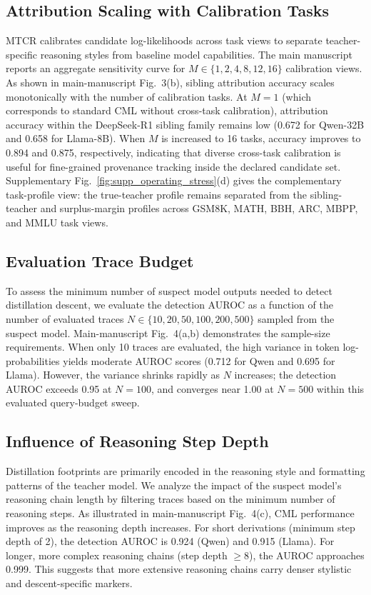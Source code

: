 \subsection{Attribution Scaling with Calibration Tasks}
MTCR calibrates candidate log-likelihoods across task views to separate teacher-specific reasoning styles from baseline model capabilities. The main manuscript reports an aggregate sensitivity curve for $M \in \{1, 2, 4, 8, 12, 16\}$ calibration views.
As shown in main-manuscript Fig.~3(b), sibling attribution accuracy scales
monotonically with the number of calibration tasks. At $M=1$ (which corresponds to
standard CML without cross-task calibration), attribution accuracy within the
DeepSeek-R1 sibling family remains low (0.672 for Qwen-32B and 0.658 for Llama-8B).
When $M$ is increased to 16 tasks, accuracy improves to 0.894 and 0.875,
respectively, indicating that diverse cross-task calibration is useful for
fine-grained provenance tracking inside the declared candidate set. Supplementary
Fig.~\ref{fig:supp_operating_stress}(d) gives the complementary task-profile view:
the true-teacher profile remains separated from the sibling-teacher and surplus-margin
profiles across GSM8K, MATH, BBH, ARC, MBPP, and MMLU task views.

\subsection{Evaluation Trace Budget}
To assess the minimum number of suspect model outputs needed to detect distillation descent, we evaluate the detection AUROC as a function of the number of evaluated traces $N \in \{10, 20, 50, 100, 200, 500\}$ sampled from the suspect model.
Main-manuscript Fig.~4(a,b) demonstrates the sample-size requirements. When only 10
traces are evaluated, the high variance in token log-probabilities yields moderate
AUROC scores (0.712 for Qwen and 0.695 for Llama). However, the variance shrinks
rapidly as $N$ increases; the detection AUROC exceeds 0.95 at $N=100$, and converges
near 1.00 at $N=500$ within this evaluated query-budget sweep.

\subsection{Influence of Reasoning Step Depth}
Distillation footprints are primarily encoded in the reasoning style and formatting patterns of the teacher model. We analyze the impact of the suspect model's reasoning chain length by filtering traces based on the minimum number of reasoning steps.
As illustrated in main-manuscript Fig.~4(c), CML performance improves as the
reasoning depth increases. For short derivations (minimum step depth of 2), the
detection AUROC is 0.924 (Qwen) and 0.915 (Llama). For longer, more complex reasoning
chains (step depth $\ge 8$), the AUROC approaches 0.999. This suggests that more
extensive reasoning chains carry denser stylistic and descent-specific markers.

